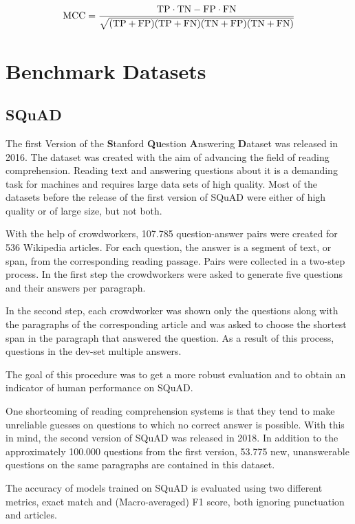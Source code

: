\documentclass[]{krantz}
\begin{document}
\[\hbox{MCC}=\frac{\hbox{TP}\cdot\hbox{TN}-\hbox{FP}\cdot\hbox{FN}}{\sqrt{(\hbox{TP}+\hbox{FP})(\hbox{TP}+\hbox{FN})(\hbox{TN}+\hbox{FP})(\hbox{TN}+\hbox{FN})}} \]
\citep{boughorbel2017optimal}

\hypertarget{benchmark-datasets}{%
\section{Benchmark Datasets}\label{benchmark-datasets}}

\hypertarget{squad}{%
\subsection{SQuAD}\label{squad}}

The first Version of the \textbf{S}tanford \textbf{Qu}estion \textbf{A}nswering \textbf{D}ataset was released in 2016. The dataset was created with the aim of advancing the field of reading comprehension. Reading text and answering questions about it is a demanding task for machines and requires large data sets of high quality. Most of the datasets before the release of the first version of SQuAD were either of high quality or of large size, but not both.

With the help of crowdworkers, 107.785 question-answer pairs were created for 536 Wikipedia articles. For each question, the answer is a segment of text, or span, from the corresponding reading passage.
Pairs were collected in a two-step process. In the first step the crowdworkers were asked to generate five questions and their answers per paragraph.

In the second step, each crowdworker was shown only the questions along with the paragraphs of the corresponding article and was asked to choose the shortest span in the paragraph that answered the question. As a result of this process, questions in the dev-set multiple answers.

The goal of this procedure was to get a more robust evaluation and to obtain an indicator of human performance on SQuAD.

One shortcoming of reading comprehension systems is that they tend to make unreliable guesses on questions to which no correct answer is possible. With this in mind, the second version of SQuAD was released in 2018. In addition to the approximately 100.000 questions from the first version, 53.775 new, unanswerable questions on the same paragraphs are contained in this dataset.

The accuracy of models trained on SQuAD is evaluated using two different metrics, exact match and (Macro-averaged) F1 score, both ignoring punctuation and articles.
\end{document}
